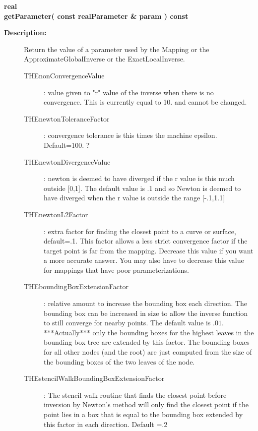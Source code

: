\begin{flushleft} \textbf{%
real  \\ 
\settowidth{\MappingIncludeArgIndent}{getParameter(}%
getParameter( const  realParameter \& param ) const
}\end{flushleft}
\begin{description}
\item[{\bf Description:}] 
   Return the value of a parameter used by the Mapping or the ApproximateGlobalInverse or the ExactLocalInverse.
 
 \begin{description}
  \item[THEnonConvergenceValue] : value given to "r" value of the inverse when there is no convergence. This is
              currently equal to 10. and cannot be changed.
  \item[THEnewtonToleranceFactor] : convergence tolerance is this times the machine epsilon. Default=100. ?
  \item[THEnewtonDivergenceValue] : newton is deemed to have diverged if the r value is this much outside [0,1].
      The default value is .1 and so Newton is deemed to have diverged when the r value is outside the range 
      [-.1,1.1]
  \item[THEnewtonL2Factor] : extra factor for finding the closest point to a curve or surface, default=.1.
          This factor allows a less strict convergence factor if the target point is far from the mapping.
          Decrease this value if you want a more accurate answer. You may also have to decrease this value
          for mappings that have poor parameterizations. 
  \item[THEboundingBoxExtensionFactor] : relative amount to increase the bounding box each direction. The bounding
     box can be increased in size to allow the inverse function to still converge for nearby points. The default
     value is $.01$. ***Actually*** only the bounding boxes for the highest leaves in the bounding box tree
     are extended by this factor. The bounding boxes for all other nodes (and the root) are just computed
     from the size of the bounding boxes of the two leaves of the node.
  \item[THEstencilWalkBoundingBoxExtensionFactor] : The stencil walk routine that finds the closest point
     before inversion by Newton's method will only find the closest point if the point lies in a box
     that is equal to the bounding box extended by this factor in each direction. Default =.2
 \end{description}

\end{description}
